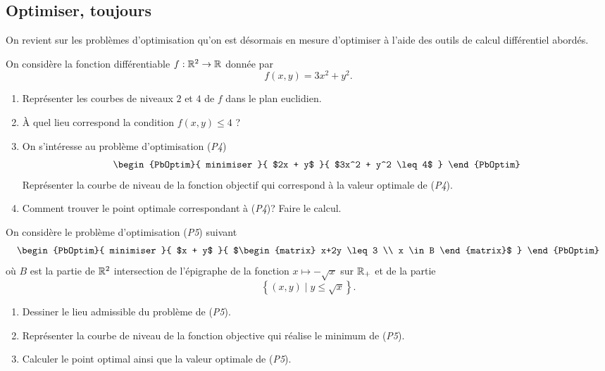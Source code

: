 \documentclass[11pt, a4paper]{article}
\begin{document}
\subsection{Optimiser, toujours}

On revient sur les problèmes d'optimisation qu'on est désormais en
mesure d'optimiser à l'aide des outils de calcul différentiel abordés.
\begin{question}
On considère la fonction différentiable $f : \mathbb{R}^2 \to \mathbb{R}$ donnée par
\[
f(x, y) = 3x^2 + y^2.
\]
\begin{enumerate}
\item Représenter les courbes de niveaux $2$ et $4$ de $f$ dans le
  plan euclidien.
\item À quel lieu correspond la condition $f(x, y) \leq 4$ ?
\item On s'intéresse au problème d'optimisation (\emph{P4})
  \[
  \begin{PbOptim}{
      minimiser
    }{
      $2x + y$
    }{
      $3x^2 + y^2 \leq 4$
    }
  \end{PbOptim}
  \]
  Représenter la courbe de niveau de la fonction objectif qui
  correspond à la valeur optimale de (\emph{P4}).
\item Comment trouver le point optimale correspondant à (\emph{P4})?
  Faire le calcul.
\end{enumerate}
\end{question}

\begin{question}
  On considère le problème d'optimisation (\emph{P5}) suivant
  \[
    \begin{PbOptim}{
        minimiser
      }{
        $x + y$
      }{
        $\begin{matrix}
          x+2y \leq 3 \\
          x \in B
        \end{matrix}$
      }
    \end{PbOptim}
  \]
  où $B$ est la partie de $\mathbb{R}^2$ intersection de l'épigraphe de la
  fonction $x \mapsto -\sqrt{x}$ sur $\mathbb{R}_+$ et de la partie
  \[
    \left\{(x, y) \mid y \leq \sqrt{x}\right\}.
  \]
  \begin{enumerate}
  \item Dessiner le lieu admissible du problème de (\emph{P5}).
  \item Représenter la courbe de niveau de la fonction objective qui
    réalise le minimum de (\emph{P5}).
  \item Calculer le point optimal ainsi que la valeur optimale de
    (\emph{P5}).
  \end{enumerate}
\end{question}
\end{document}
